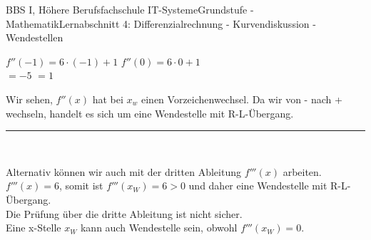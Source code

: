 \documentclass[11pt,twocolumn,oneside,openany,headings=optiontotoc,11pt,numbers=noenddot]{article}
\begin{document}
\begin{worksheet}{BBS I, Höhere Berufsfachschule IT-Systeme}{Grundstufe - Mathematik}{Lernabschnitt 4: Differenzialrechnung - Kurvendiskussion - Wendestellen}
\begin{tabbing}
			\(f''(-1) = 6\cdot(-1) + 1\) \> \(f''(0) = 6\cdot{}0 + 1\)\\
			\( = -5\) \> \(= 1\)
		\end{tabbing}
		Wir sehen, \(f''(x)\) hat bei \(x_w\) einen Vorzeichenwechsel. Da wir von \glqq{}-\grqq{} nach \glqq{}+\grqq{} wechseln, handelt es sich um eine Wendestelle mit R-L-Übergang.\\
		\rule{0.48\textwidth}{0.1pt}\\
		\par\noindent
		Alternativ können wir auch mit der dritten Ableitung \(f'''(x)\) arbeiten.\\
		\(f'''(x) = 6\), somit ist \(f'''(x_W) = 6 > 0\) und daher eine Wendestelle mit R-L-Übergang.\\
		\normalcolor{} Die Prüfung über die dritte Ableitung ist nicht sicher.\\
		Eine x-Stelle \(x_W\) kann auch Wendestelle sein, obwohl \(f'''(x_W) = 0\).
		\newpage

\end{worksheet}
\end{document}
